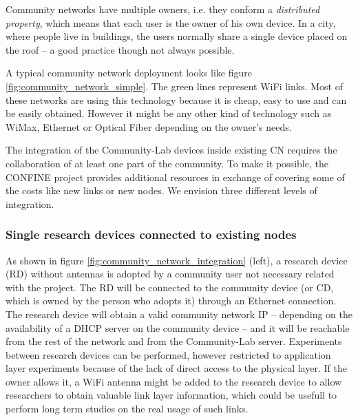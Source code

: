 \documentclass[conference]{IEEEtran}
\begin{document}
Community networks have multiple owners, i.e. they conform a \textit{distributed property}, 
which means that each user is the owner of his own device. In a city, where people live in 
buildings, the users normally share a single device placed on the roof -- a good practice though
not always possible.

A typical community network deployment looks like figure \ref{fig:community_network_simple}.
The green lines represent WiFi links. Most of these networks are using this technology because 
it is cheap, easy to use and can be easily obtained. However it might be any other kind of technology 
such as WiMax, Ethernet or Optical Fiber depending on the owner's needs.


The integration of the Community-Lab devices inside existing CN requires the collaboration of at least
one part of the community. To make it possible, the CONFINE project provides additional resources in exchange
of covering some of the costs like new links or new nodes. We envision three different levels of integration.

\subsubsection{Single research devices connected to existing nodes}
\label{sec:single-research-devices}

As shown in figure \ref{fig:community_network_integration} (left), a research device (RD) without antennas is 
adopted by a community user not necessary related with the project.
The RD will be connected to the community device (or CD, which is owned by the person who adopts it) through an Ethernet connection. 
The research device will obtain a valid community network IP -- depending on the availability of a DHCP server on the community device --
and it will be reachable from the rest of the network and from the Community-Lab server.
Experiments between research devices can be performed, however restricted to application layer experiments because of the 
lack of direct access to the physical layer. If the owner allows it, a WiFi antenna might be 
added to the research device to allow researchers to obtain valuable link layer information, which could
be usefull to perform long term studies on the real usage of such links.
\end{document}
